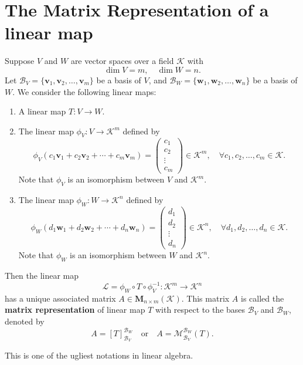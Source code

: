 	\section{The Matrix Representation of a linear map}
	\begin{definitionenv}
		Suppose $V$ and $W$ are vector spaces over a field $\mathcal{K}$ with
		\[
		\dim V = m, \quad \dim W = n.
		\]
		Let $\mathcal{B}_V = \{\bm{v}_1, \bm{v}_2, \dots, \bm{v}_m\}$ be a basis of $V$, and $\mathcal{B}_W = \{\bm{w}_1, \bm{w}_2, \dots, \bm{w}_n\}$ be a basis of $W$. We consider the following linear maps:
		\begin{enumerate}
			\item A linear map $T: V \to W$.
			\item The linear map $\phi_V:V\to \mathcal{K}^m$ defined by
			\[
			\phi_V(c_1 \bm{v}_1 + c_2 \bm{v}_2 + \cdots + c_m \bm{v}_m) =
			\begin{pmatrix}
				c_1 \\ c_2 \\ \vdots \\ c_m
			\end{pmatrix} \in \mathcal{K}^m,
			\quad \forall c_1, c_2, \dots, c_m \in \mathcal{K}.
			\]
			Note that $\phi_V$ is an isomorphism between $V$ and $\mathcal{K}^m$.
			\item The linear map $\phi_W:W \to \mathcal{K}^n$ defined by
			\[
			\phi_W(d_1 \bm{w}_1 + d_2 \bm{w}_2 + \cdots + d_n \bm{w}_n) =
			\begin{pmatrix}
				d_1 \\ d_2 \\ \vdots \\ d_n
			\end{pmatrix} \in \mathcal{K}^n,
			\quad \forall d_1, d_2, \dots, d_n \in \mathcal{K}.
			\]
			Note that $\phi_W$ is an isomorphism between $W$ and $\mathcal{K}^n$.
		\end{enumerate}
		Then the linear map \[ \mathcal{L} = \phi_W \circ T \circ \phi_V^{-1}: \mathcal{K}^m \to \mathcal{K}^n\] has a unique associated matrix $A \in \bm{M}_{n \times m}(\mathcal{K})$. This matrix $A$ is called the \textbf{matrix representation} of linear map $T$ with respect to the bases $\mathcal{B}_V$ and $\mathcal{B}_W$, denoted by \[ A=[T]^{\mathcal{B}_W}_{\mathcal{B}_V}\quad \text{or}\quad A=\mathcal{M}^{\mathcal{B}_W}_{\mathcal{B}_V}(T).\]
	\end{definitionenv}
	\begin{remarkenv}
		This is one of the ugliest notations in linear algebra.
	\end{remarkenv}
